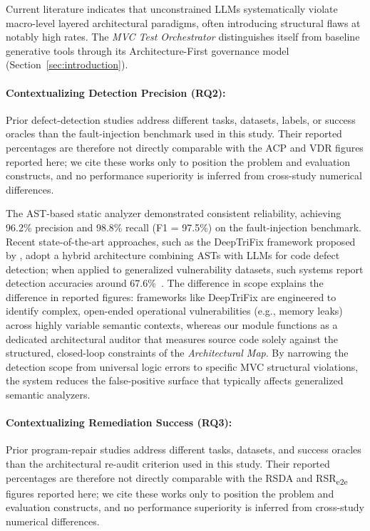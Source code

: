 Current literature indicates that unconstrained LLMs systematically violate macro-level layered architectural paradigms, often introducing structural flaws at notably high rates. The \textit{MVC Test Orchestrator} distinguishes itself from baseline generative tools through its Architecture-First governance model (Section~\ref{sec:introduction}).

\paragraph{Contextualizing Detection Precision (RQ2):}
Prior defect-detection studies address different tasks, datasets, labels, or success oracles than the fault-injection benchmark used in this study. Their reported percentages are therefore not directly comparable with the ACP and VDR figures reported here; we cite these works only to position the problem and evaluation constructs, and no performance superiority is inferred from cross-study numerical differences.

The AST-based static analyzer demonstrated consistent reliability, achieving 96.2\% precision and 98.8\% recall (F1 = 97.5\%) on the fault-injection benchmark. Recent state-of-the-art approaches, such as the DeepTriFix framework proposed by \citet{wan2025deeptrifix}, adopt a hybrid architecture combining ASTs with LLMs for code defect detection; when applied to generalized vulnerability datasets, such systems report detection accuracies around 67.6\%~\citep{wan2025deeptrifix}. The difference in scope explains the difference in reported figures: frameworks like DeepTriFix are engineered to identify complex, open-ended operational vulnerabilities (e.g., memory leaks) across highly variable semantic contexts, whereas our module functions as a dedicated architectural auditor that measures source code solely against the structured, closed-loop constraints of the \textit{Architectural Map}. By narrowing the detection scope from universal logic errors to specific MVC structural violations, the system reduces the false-positive surface that typically affects generalized semantic analyzers.

\paragraph{Contextualizing Remediation Success (RQ3):}
Prior program-repair studies address different tasks, datasets, and success oracles than the architectural re-audit criterion used in this study. Their reported percentages are therefore not directly comparable with the RSDA and RSR\textsubscript{e2e} figures reported here; we cite these works only to position the problem and evaluation constructs, and no performance superiority is inferred from cross-study numerical differences.

